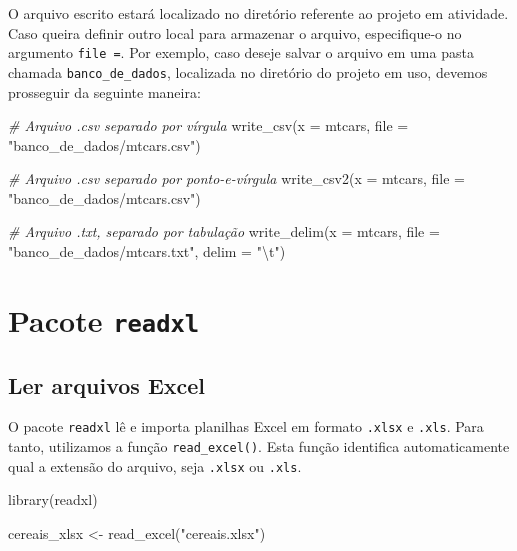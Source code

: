 \documentclass[
  brazilian,
]{book}
\newenvironment{Shaded}{\begin{snugshade}}{\end{snugshade}}
\newcommand{\AttributeTok}[1]{\textcolor[rgb]{0.77,0.63,0.00}{#1}}
\newcommand{\CommentTok}[1]{\textcolor[rgb]{0.56,0.35,0.01}{\textit{#1}}}
\newcommand{\FunctionTok}[1]{\textcolor[rgb]{0.00,0.00,0.00}{#1}}
\newcommand{\NormalTok}[1]{#1}
\newcommand{\OtherTok}[1]{\textcolor[rgb]{0.56,0.35,0.01}{#1}}
\newcommand{\SpecialCharTok}[1]{\textcolor[rgb]{0.00,0.00,0.00}{#1}}
\newcommand{\StringTok}[1]{\textcolor[rgb]{0.31,0.60,0.02}{#1}}
\begin{document}
O arquivo escrito estará localizado no diretório referente ao projeto em atividade. Caso queira definir outro local para armazenar o arquivo, especifique-o no argumento \texttt{file\ =}. Por exemplo, caso deseje salvar o arquivo em uma pasta chamada \texttt{banco\_de\_dados}, localizada no diretório do projeto em uso, devemos prosseguir da seguinte maneira:

\begin{Shaded}
\begin{Highlighting}[]
\CommentTok{\# Arquivo .csv separado por vírgula}
\FunctionTok{write\_csv}\NormalTok{(}\AttributeTok{x =}\NormalTok{ mtcars, }\AttributeTok{file =} \StringTok{"banco\_de\_dados/mtcars.csv"}\NormalTok{)}

\CommentTok{\# Arquivo .csv separado por ponto{-}e{-}vírgula}
\FunctionTok{write\_csv2}\NormalTok{(}\AttributeTok{x =}\NormalTok{ mtcars, }\AttributeTok{file =} \StringTok{"banco\_de\_dados/mtcars.csv"}\NormalTok{)}

\CommentTok{\# Arquivo .txt, separado por tabulação}
\FunctionTok{write\_delim}\NormalTok{(}\AttributeTok{x =}\NormalTok{ mtcars, }\AttributeTok{file =} \StringTok{"banco\_de\_dados/mtcars.txt"}\NormalTok{, }\AttributeTok{delim =} \StringTok{"}\SpecialCharTok{\textbackslash{}t}\StringTok{"}\NormalTok{)}
\end{Highlighting}
\end{Shaded}

\hypertarget{pacote-readxl}{%
\section{\texorpdfstring{Pacote \texttt{readxl}}{Pacote readxl}}\label{pacote-readxl}}

\hypertarget{ler-arquivos-excel}{%
\subsection{Ler arquivos Excel}\label{ler-arquivos-excel}}

O pacote \texttt{readxl} lê e importa planilhas Excel em formato \texttt{.xlsx} e \texttt{.xls}. Para tanto, utilizamos a função \texttt{read\_excel()}. Esta função identifica automaticamente qual a extensão do arquivo, seja \texttt{.xlsx} ou \texttt{.xls}.

\begin{Shaded}
\begin{Highlighting}[]
\FunctionTok{library}\NormalTok{(readxl)}

\NormalTok{cereais\_xlsx }\OtherTok{\textless{}{-}} \FunctionTok{read\_excel}\NormalTok{(}\StringTok{"cereais.xlsx"}\NormalTok{)}
\end{Highlighting}
\end{Shaded}
\end{document}
